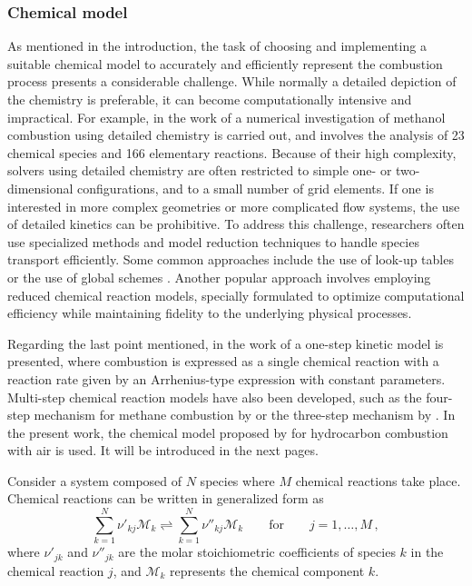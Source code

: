 \subsubsection{Chemical model}
As mentioned in the introduction, the task of choosing and implementing a suitable chemical model to accurately and efficiently represent the combustion process presents a considerable challenge. While normally a detailed depiction of the chemistry is preferable, it can become computationally intensive and impractical. For example, in the work of \textcite{stauchDetailedNumericalSimulation2006} a numerical investigation of methanol combustion using detailed chemistry is carried out, and involves the analysis of 23 chemical species and 166 elementary reactions. Because of their high complexity, solvers using detailed chemistry are often restricted to simple one- or two-dimensional configurations, and to a small number of grid elements. If one is interested in more complex geometries or more complicated flow systems, the use of detailed kinetics can be prohibitive.  To address this challenge, researchers often use specialized methods and model reduction techniques to handle species transport efficiently. Some common approaches include the use of look-up tables or the use of global schemes \parencite{poinsotTheoreticalNumericalCombustion2011}. Another popular approach involves employing reduced chemical reaction models, specially formulated to optimize computational efficiency while maintaining fidelity to the underlying physical processes.

Regarding the last point mentioned, in the work of \textcite{westbrookSimplifiedReactionMechanisms1981} a one-step kinetic model is presented, where combustion is expressed as a single chemical reaction with a reaction rate given by an Arrhenius-type expression with constant parameters. Multi-step chemical reaction models have also been developed, such as the four-step mechanism for methane combustion by \textcite{petersNumericalAsymptoticAnalysis1985} or the three-step mechanism by \textcite{petersAsymptoticStructureStoichiometric1987}. In the present work, the chemical model proposed by \textcite{fernandez-tarrazoSimpleOnestepChemistry2006} for hydrocarbon combustion with air is used. It will be introduced in the next pages.

Consider a system composed of $N$ species where $M$ chemical reactions take place. Chemical reactions can be written in generalized form as 
\begin{equation}\label{eq:allChemEq}
	\sum_{k=1}^{N} \nu'_{kj}\mathcal{M}_k  \rightleftharpoons \sum_{k=1}^{N} \nu''_{kj}\mathcal{M}_k  \qquad \text{for}\qquad j=1,\dots,M\, ,
\end{equation}
where $\nu'_{jk}$ and $\nu''_{jk}$ are the molar stoichiometric coefficients of species $k$ in the chemical reaction $j$, and $\mathcal{M}_k$ represents the chemical component $k$. \newline


